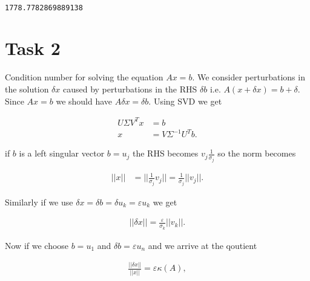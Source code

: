 \documentclass[11pt]{article}
\makeatletter
\newcommand{\boxspacing}{\kern\kvtcb@left@rule\kern\kvtcb@boxsep}
\newcommand{\prompt}[4]{
        {\ttfamily\llap{{\color{#2}[#3]:\hspace{3pt}#4}}\vspace{-\baselineskip}}
    }
\makeatother
\begin{document}
    \begin{center}
    \end{center}
    { \hspace*{\fill} \\}
    
            \begin{tcolorbox}[breakable, size=fbox, boxrule=.5pt, pad at break*=1mm, opacityfill=0]
\prompt{Out}{outcolor}{220}{\boxspacing}
\begin{Verbatim}[commandchars=\\\{\}]
1778.7782869889138
\end{Verbatim}
\end{tcolorbox}
        
    \section{Task 2}\label{task-2}

    Condition number for solving the equation \(Ax=b\). We consider
perturbations in the solution \(\delta x\) caused by perturbations in
the RHS \(\delta b\) i.e. \(A(x+\delta x)=b + \delta\). Since \(Ax=b\)
we should have \(A\delta x=\delta b\). Using SVD we get

\begin{align}
    U\Sigma V^T x &= b \\
    x &= V \Sigma^{-1} U^T b.
\end{align}

if \(b\) is a left singular vector \(b = u_j\) the RHS becomes
\(v_j \frac{1}{\sigma_j}\) so the norm becomes

\begin{align}
    || x  || &= || \frac{1}{\sigma_j} v_j || = \frac{1}{\sigma_j} ||v_j||.
\end{align}

Similarly if we use
\(\delta x = \delta b = \delta u_k = \varepsilon u_k\) we get

\begin{align}
    ||\delta x || = \frac{\varepsilon}{\sigma_k} ||v_k||.
\end{align}

Now if we choose \(b=u_1\) and \(\delta b = \varepsilon u_n\) and we
arrive at the qoutient

\begin{align}
\frac{|| \delta x ||}{|| x ||} = \varepsilon \kappa(A),
\end{align}
\end{document}
